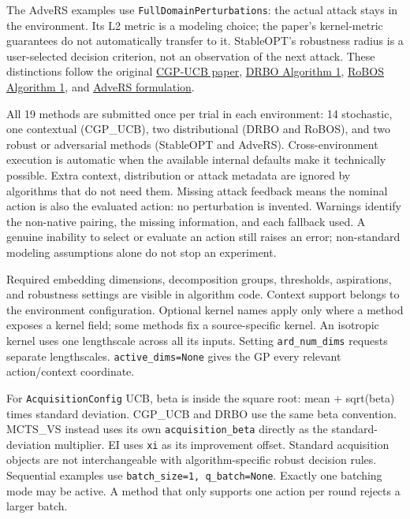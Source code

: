 \documentclass[10pt,a4paper]{article}
\begin{document}
The AdveRS examples use \texttt{Full\allowbreak{}Domain\allowbreak{}Perturbations}: the actual attack stays in the environment. Its L2 metric is a modeling choice; the paper's kernel-metric guarantees do not automatically transfer to it. StableOPT's robustness radius is a user-selected decision criterion,\allowbreak{} not an observation of the next attack. These distinctions follow the original \href{https://papers.neurips.cc/paper/4487-contextual-gaussian-process-bandit-optimization.pdf}{CGP-UCB paper},\allowbreak{} \href{https://proceedings.mlr.press/v108/kirschner20a/kirschner20a.pdf}{DRBO Algorithm 1},\allowbreak{} \href{https://proceedings.neurips.cc/paper_files/paper/2023/file/daa098aa8e1fc718943ff1ab7b5b30c9-Paper-Conference.pdf}{RoBOS Algorithm 1},\allowbreak{} and \href{https://proceedings.neurips.cc/paper_files/paper/2025/file/4830a9b95a2f63fc4b3fe09abc18f045-Paper-Conference.pdf}{AdveRS formulation}.


All 19 methods are submitted once per trial in each environment: 14 stochastic,\allowbreak{} one contextual (CGP\_\allowbreak{}UCB),\allowbreak{} two distributional (DRBO and RoBOS),\allowbreak{} and two robust or adversarial methods (StableOPT and AdveRS). Cross-environment execution is automatic when the available internal defaults make it technically possible. Extra context,\allowbreak{} distribution or attack metadata are ignored by algorithms that do not need them. Missing attack feedback means the nominal action is also the evaluated action: no perturbation is invented. Warnings identify the non-native pairing,\allowbreak{} the missing information,\allowbreak{} and each fallback used. A genuine inability to select or evaluate an action still raises an error; non-standard modeling assumptions alone do not stop an experiment.


Required embedding dimensions,\allowbreak{} decomposition groups,\allowbreak{} thresholds,\allowbreak{} aspirations,\allowbreak{} and robustness settings are visible in algorithm code. Context support belongs to the environment configuration. Optional kernel names apply only where a method exposes a kernel field; some methods fix a source-specific kernel. An isotropic kernel uses one lengthscale across all its inputs. Setting \texttt{ard\_\allowbreak{}num\_\allowbreak{}dims} requests separate lengthscales. \texttt{active\_\allowbreak{}dims=\allowbreak{}None} gives the GP every relevant action/context coordinate.


For \texttt{Acquisition\allowbreak{}Config} UCB,\allowbreak{} beta is inside the square root: mean + sqrt(beta) times standard deviation. CGP\_\allowbreak{}UCB and DRBO use the same beta convention. MCTS\_\allowbreak{}VS instead uses its own \texttt{acquisition\_\allowbreak{}beta} directly as the standard- deviation multiplier. EI uses \texttt{xi} as its improvement offset. Standard acquisition objects are not interchangeable with algorithm-specific robust decision rules. Sequential examples use \texttt{batch\_\allowbreak{}size=\allowbreak{}1,\allowbreak{} q\_\allowbreak{}batch=\allowbreak{}None}. Exactly one batching mode may be active. A method that only supports one action per round rejects a larger batch.
\end{document}
